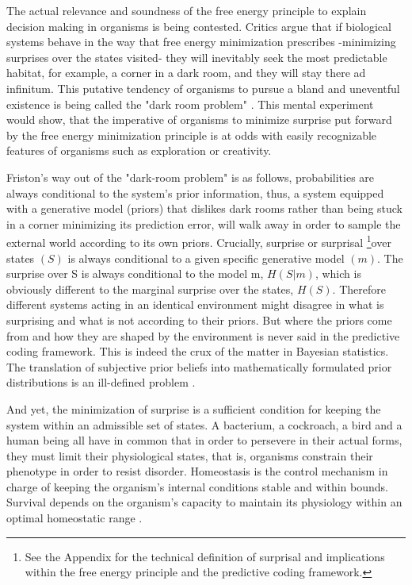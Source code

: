 \documentclass[11pt, onecolumn]{article}
\begin{document}
The actual relevance and soundness of the free energy principle to explain decision making in organisms is being contested. Critics argue that if biological systems behave in the way that free energy minimization prescribes -minimizing surprises over the states visited- they will inevitably seek the most predictable habitat, for example, a corner in a dark room, and they will stay there ad infinitum. This putative tendency of organisms to pursue a bland and uneventful existence is 
being called the "dark room problem" \citep{friston_free-energy_2012}. 
This mental experiment would show, that the imperative of organisms to minimize surprise put forward by the free energy minimization principle is at odds with easily recognizable features of organisms such as exploration or creativity.

Friston's way out of the "dark-room problem" is as follows, probabilities are always conditional to the system's prior information, thus, a system equipped with a generative model (priors) that dislikes dark rooms rather than being stuck in a corner minimizing its prediction error, will walk away in order to sample the external world according to its own priors. Crucially, surprise or surprisal  \footnote{See the Appendix for the technical definition of surprisal and implications within the free energy principle and the predictive coding framework.}over states $(S)$ is always conditional to a given specific generative model $(m)$. The surprise over S is always conditional to the model m, $H(S|m)$, which is obviously different to the marginal surprise over the states, $H(S)$. Therefore different systems acting in an identical environment might disagree in what is surprising and what is not according to their priors.
But where the priors come from and how they are shaped by the environment is never said in the predictive coding framework. This is indeed the crux of the matter in Bayesian statistics. The translation of subjective prior beliefs into mathematically formulated prior distributions is an ill-defined problem \citep{Gomez-ramirez_limitations_2013}. 

And yet, the minimization of surprise is a sufficient condition for keeping the system within an admissible set of states. 
A bacterium, a cockroach, a bird and a human being all have in common that in order to persevere in their actual forms, they must limit their physiological states, that is, organisms constrain their phenotype in order to resist disorder. 
Homeostasis is the control mechanism in charge of keeping the organism's internal conditions stable and within bounds. Survival depends on the organism's capacity to maintain its physiology within an optimal homeostatic range \citep{damasio_nature_2013}. 
\end{document}
